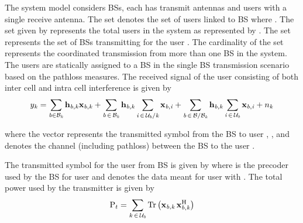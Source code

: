 
The system model considers  BSs, each has  transmit antennas and  users with a single receive antenna. The set  denotes the set of users linked to BS  where . The set  given by  represents the total users in the system as represented by . The set  represents the set of BSs transmitting for the user . The cardinality of the set  represents the coordinated transmission from more than one  BS in the system. The users are statically assigned to a BS in the single BS transmission scenario based on the pathloss measures. The received signal  of the user  consisting of both inter cell and intra cell interference is given by
\begin{equation}
{y}_{\mathit{k}} = \sum_{\mathit{b} \in \mathcal{B}_{\mathit{k}}} \mathbf{h}_{\mathit{b},\mathit{k}} \mathbf{x}_{\mathit{b},\mathit{k}} + \sum_{\mathit{b} \, \in \, \mathcal{B}_{\mathit{k}}} \mathbf{h}_{\mathit{b},\mathit{k}} \sum_{\mathit{i} \, \in \, \mathcal{U}_{\mathit{b}} / \mathit{k}} \mathbf{x}_{\mathit{b},\mathit{i}} + \sum_{\mathit{b} \, \in \, \mathcal{B} / \mathcal{B}_{\mathit{k}}} \mathbf{h}_{\mathit{b},\mathit{k}} \sum_{\mathit{i} \, \in \, \mathcal{U}_{\mathit{b}}} \mathbf{x}_{\mathit{b},\mathit{i}} + {n}_{\mathit{k}}
\label{sm-e1}
\end{equation}

where the vector  represents the transmitted symbol from the BS  to user , , and  denotes the channel (including pathloss) between the BS  to the user .

The transmitted symbol  for the user  from BS  is given by  where  is the precoder used by the BS  for user  and  denotes the data meant for user  with . The total power used by the transmitter is given by
\begin{equation}
\mathrm{P}_{t} = \sum_{k \, \in \, \mathcal{U}_{\mathit{b}}} \mathrm{Tr} \left ( \mathbf{x}_{\mathit{b},\mathit{k}} \, \mathbf{x}_{\mathit{b},\mathit{k}}^{\mathrm{H}} \right )
\label{sm-e2}
\end{equation}

